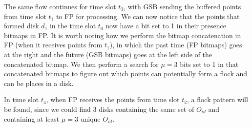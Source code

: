 The same flow continues for time slot $t_3$, with GSB sending the buffered points from time slot $t_1$ to FP for
processing. We can now notice that the points that formed disk $d_1$ in the time slot $t_0$ now have a bit set to 1 in
their presence bitmaps in FP. It is worth noting how we perform the bitmap concatenation in FP (when it receives points
from $t_1$), in which the past time (FP bitmaps) goes at the right and the future (GSB bitmaps) goes at the left side of
the concatenated bitmap. We then perform a search for $\mu = 3$ bits set to 1 in that concatenated bitmaps to figure out
which points can potentially form a flock and can be places in a disk.

In time slot $t_4$, when FP receives the points from time slot $t_2$, a flock pattern will be found, since we could find
3 disks containing the same set of $O_{id}$ and containing at least $\mu = 3$ unique $O_{id}$.
